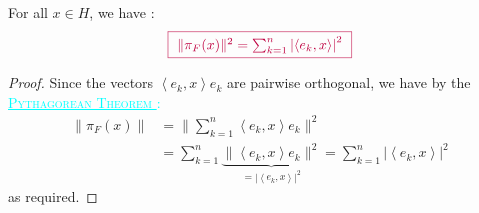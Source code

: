 \begin{corollary}[]
For all $x \in  H $, we have : 
\[
  \textcolor{purple}{
  \fbox{ 
    $\| \pi _{F}(x)  \| ^2 = 
    \sum_{k=1}^{n} 
    \left| 
    \left\langle e_{k}, x \right\rangle 
    \right|^2 $ 
  }
  }
\]
\end{corollary}
\begin{proof}
Since the vectors $\left\langle e_{k}, x \right\rangle e_{k} $ are pairwise
orthogonal, we have by the 
  \textcolor{cyan}{
\underline{
  \textsc{
Pythagorean 
Theorem 
  }
} :
  }
 \begin{align*}
   \| \pi _{F}(x)  \|  &= 
   \| \sum_{k=1}^{n} 
   \left\langle e_{k}, x \right\rangle e_{k}\| ^2  \\
   &=  
   \sum_{k=1}^{n} 
   \underbrace{
   \| 
   \left\langle 
     e_{k},x
   \right\rangle e_{k}
   \| ^2  
   }_{= \left| \left\langle e_{k},x \right\rangle  \right|^2 } 
   = \sum_{k=1}^{n} 
   \left| \left\langle e_{k},x \right\rangle  \right|^2 
 \end{align*}
 as required.
\end{proof}

